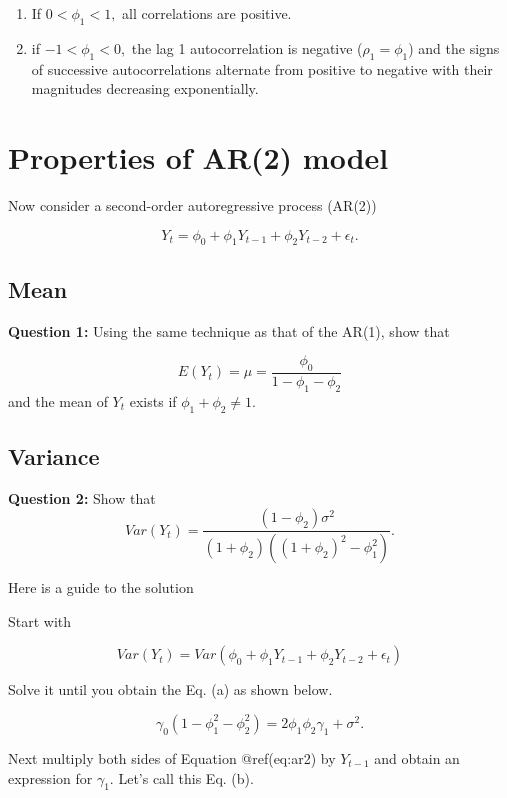 \documentclass[
  11pt,
  a4paper,
]{report}
\begin{document}
\begin{enumerate}
\def\labelenumi{\arabic{enumi}.}
\item
  If \(0 < \phi_1 < 1,\) all correlations are positive.
\item
  if \(-1 < \phi_1 < 0,\) the lag 1 autocorrelation is negative
  (\(\rho_1=\phi_1\)) and the signs of successive autocorrelations
  alternate from positive to negative with their magnitudes decreasing
  exponentially.
\end{enumerate}

\section{Properties of AR(2) model}\label{properties-of-ar2-model}

Now consider a second-order autoregressive process (AR(2))

\begin{equation}
  \label{eq:ar2}
Y_t=\phi_0+\phi_1Y_{t-1}+\phi_2Y_{t-2}+\epsilon_t.
\end{equation}

\subsection{Mean}\label{mean-1}

\textbf{Question 1:} Using the same technique as that of the AR(1), show
that

\[E(Y_t) = \mu = \frac{\phi_0}{1-\phi_1 - \phi_2}\] and the mean of
\(Y_t\) exists if \(\phi_1 + \phi_2 \neq 1\).

\subsection{Variance}\label{variance}

\textbf{Question 2:} Show that
\[Var(Y_t) = \frac{(1-\phi_2)\sigma^2}{(1+\phi_2)((1+\phi_2)^2-\phi_1^2)}.\]

Here is a guide to the solution

Start with

\[Var(Y_t)=Var(\phi_0+\phi_1Y_{t-1}+\phi_2Y_{t-2}+\epsilon_t)\]

Solve it until you obtain the Eq. (a) as shown below.

\begin{equation}
\tag{a}
\gamma_0 (1-\phi_1^2 - \phi_2^2) = 2\phi_1\phi_2\gamma_1+\sigma^2.
\end{equation}

Next multiply both sides of Equation @ref(eq:ar2) by \(Y_{t-1}\) and
obtain an expression for \(\gamma_1\). Let's call this Eq. (b).
\end{document}
